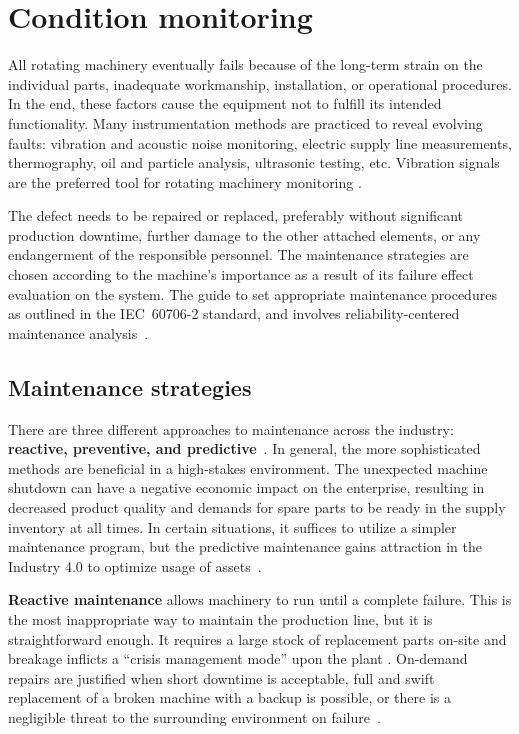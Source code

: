 \section{Condition monitoring} \label{section:condition-monitoring}
All rotating machinery eventually fails because of the long-term strain on the individual parts, inadequate workmanship, installation, or operational procedures. In the end, these factors cause the equipment not to fulfill its intended functionality. Many instrumentation methods are practiced to reveal evolving faults: vibration and acoustic noise monitoring, electric supply line measurements, thermography, oil and particle analysis, ultrasonic testing, etc. Vibration signals are the preferred tool for rotating machinery monitoring \cite{mohanty_machinery_2015}.

The defect needs to be repaired or replaced, preferably without significant production downtime, further damage to the other attached elements, or any endangerment of the responsible personnel. The maintenance strategies are chosen according to the machine's importance as a result of its failure effect evaluation on the system. The guide to set appropriate maintenance procedures as outlined in the IEC~60706-2 standard, and involves reliability-centered maintenance analysis~\cite{el-thalji_predictive_2019}.

\subsection{Maintenance strategies}
There are three different approaches to maintenance across the industry: \textbf{reactive, preventive, and predictive}~\cite{scheffer_practical_2004}. In general, the more sophisticated methods are beneficial in a high-stakes environment. The unexpected machine shutdown can have a negative economic impact on the enterprise, resulting in decreased product quality and demands for spare parts to be ready in the supply inventory at all times. In certain situations, it suffices to utilize a simpler maintenance program, but the predictive maintenance gains attraction in the Industry 4.0 to optimize usage of assets~\cite{cinar_machine_2020}.

\textbf{Reactive maintenance} allows machinery to run until a complete failure. This is the most inappropriate way to maintain the production line, but it is straightforward enough. It requires a large stock of replacement parts on-site and breakage inflicts a ``crisis management mode'' upon the plant \cite{scheffer_practical_2004}. On-demand repairs are justified when short downtime is acceptable, full and swift replacement of a broken machine with a backup is possible, or there is a negligible threat to the surrounding environment on failure~\cite{ziaran_technicka_2013}.

